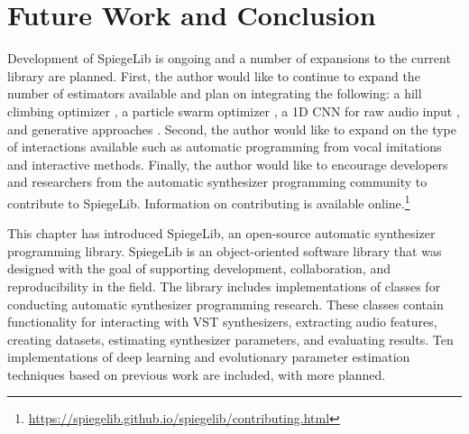 \section{Future Work and Conclusion}
Development of SpiegeLib is ongoing and a number of expansions to the current library are planned. First, the author would like to continue to expand the number of estimators available and plan on integrating the following: a hill climbing optimizer \cite{yee2018automatic}, a particle swarm optimizer \cite{heise2009automatic}, a 1D CNN for raw audio input \cite{barkan2019inversynth}, and generative approaches \cite{esling2020flow, le2021improving}.  Second, the author would like to expand on the type of interactions available such as automatic programming from vocal imitations \cite{mcartwright2014} and interactive methods. 
Finally, the author would like to encourage developers and researchers from the automatic synthesizer programming community to contribute to SpiegeLib. Information on contributing is available online.\footnote{\url{https://spiegelib.github.io/spiegelib/contributing.html}} 

This chapter has introduced SpiegeLib, an open-source automatic synthesizer programming library. SpiegeLib is an object-oriented software library that was designed with the goal of supporting development, collaboration, and reproducibility in the field. The library includes implementations of classes for conducting automatic synthesizer programming research. These classes contain functionality for interacting with VST synthesizers, extracting audio features, creating datasets, estimating synthesizer parameters, and evaluating results. Ten implementations of deep learning and evolutionary parameter estimation techniques based on previous work are included, with more planned.